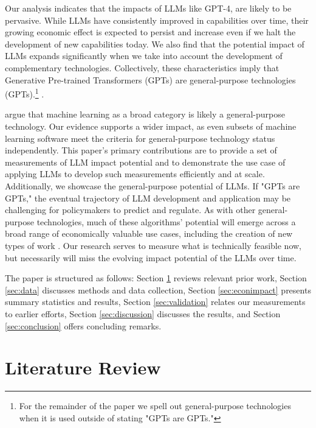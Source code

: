 \documentclass[11pt]{article}
\begin{document}
Our analysis indicates that the impacts of LLMs like GPT-4, are likely to be pervasive. While LLMs have consistently improved in capabilities over time, their growing economic effect is expected to persist and increase even if we halt the development of new capabilities today. We also find that the potential impact of LLMs expands significantly when we take into account the development of complementary technologies. Collectively, these characteristics imply that Generative Pre-trained Transformers (GPTs) are general-purpose technologies (GPTs).\footnote{For the remainder of the paper we spell out general-purpose technologies when it is used outside of stating "GPTs are GPTs."} \citep{bresnahan1995general, lipsey2005economic}. 

\citep{goldfarb2023could} argue that machine learning as a broad category is likely a general-purpose technology. Our evidence supports a wider impact, as even subsets of machine learning software meet the criteria for general-purpose technology status independently. This paper's primary contributions are to provide a set of measurements of LLM impact potential and to demonstrate the use case of applying LLMs to develop such measurements efficiently and at scale. Additionally, we showcase the general-purpose potential of LLMs. If "GPTs are GPTs," the eventual trajectory of LLM development and application may be challenging for policymakers to predict and regulate. As with other general-purpose technologies, much of these algorithms' potential will emerge across a broad range of economically valuable use cases, including the creation of new types of work \citep{acemoglu2018race, autor2022new}. Our research serves to measure what is technically feasible now, but necessarily will miss the evolving impact potential of the LLMs over time.

The paper is structured as follows: Section \ref{sec:litreview} reviews relevant prior work, Section \ref{sec:data} discusses methods and data collection, Section \ref{sec:econimpact} presents summary statistics and results, Section \ref{sec:validation} relates our measurements to earlier efforts, Section \ref{sec:discussion} discusses the results, and Section \ref{sec:conclusion} offers concluding remarks.

\section{Literature Review}
\label{sec:litreview}
\end{document}
